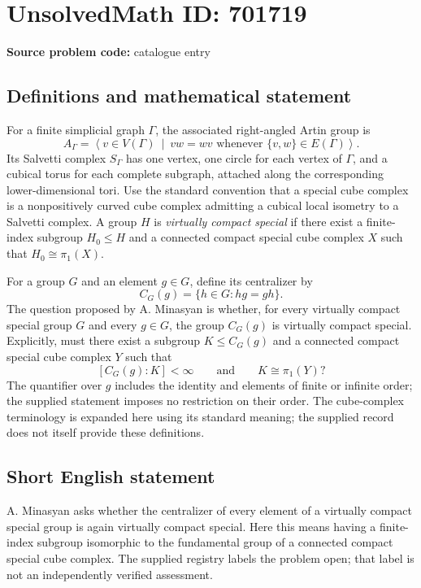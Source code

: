 \documentclass[11pt]{article}
\begin{document}
\section*{UnsolvedMath ID: 701719}
\textbf{Source problem code:} catalogue entry
\subsection{Definitions and mathematical statement}
For a finite simplicial graph \(\Gamma\), the associated right-angled Artin group is
\[
A_\Gamma=\left\langle v\in V(\Gamma)\ \middle|\ vw=wv\text{ whenever }\{v,w\}\in E(\Gamma)\right\rangle.
\]
Its Salvetti complex \(S_\Gamma\) has one vertex, one circle for each vertex of \(\Gamma\), and a cubical torus for each complete subgraph, attached along the corresponding lower-dimensional tori. Use the standard convention that a special cube complex is a nonpositively curved cube complex admitting a cubical local isometry to a Salvetti complex. A group \(H\) is \emph{virtually compact special} if there exist a finite-index subgroup \(H_0\leq H\) and a connected compact special cube complex \(X\) such that \(H_0\cong\pi_1(X)\).

For a group \(G\) and an element \(g\in G\), define its centralizer by
\[
C_G(g)=\{h\in G: hg=gh\}.
\]
The question proposed by A. Minasyan is whether, for every virtually compact special group \(G\) and every \(g\in G\), the group \(C_G(g)\) is virtually compact special. Explicitly, must there exist a subgroup \(K\leq C_G(g)\) and a connected compact special cube complex \(Y\) such that
\[
[C_G(g):K]<\infty
\qquad\text{and}\qquad
K\cong\pi_1(Y)?
\]
The quantifier over \(g\) includes the identity and elements of finite or infinite order; the supplied statement imposes no restriction on their order. The cube-complex terminology is expanded here using its standard meaning; the supplied record does not itself provide these definitions.
\subsection{Short English statement}
A. Minasyan asks whether the centralizer of every element of a virtually compact special group is again virtually compact special. Here this means having a finite-index subgroup isomorphic to the fundamental group of a connected compact special cube complex. The supplied registry labels the problem open; that label is not an independently verified assessment.
\end{document}
